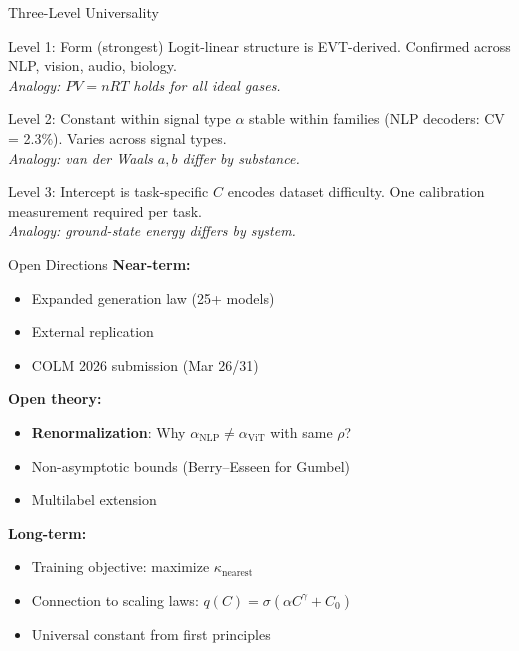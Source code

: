 \documentclass[aspectratio=169,14pt]{beamer}
\begin{document}
\begin{frame}{Three-Level Universality}
\begin{block}{Level 1: Form (strongest)}
Logit-linear structure is EVT-derived. Confirmed across NLP, vision, audio, biology.\\
\textit{Analogy: $PV = nRT$ holds for all ideal gases.}
\end{block}

\begin{block}{Level 2: Constant within signal type}
$\alpha$ stable within families (NLP decoders: CV = 2.3\%). Varies across signal types.\\
\textit{Analogy: van der Waals $a, b$ differ by substance.}
\end{block}

\begin{alertblock}{Level 3: Intercept is task-specific}
$C$ encodes dataset difficulty. One calibration measurement required per task.\\
\textit{Analogy: ground-state energy differs by system.}
\end{alertblock}
\end{frame}

\begin{frame}{Open Directions}
\textbf{Near-term:}
\begin{itemize}
\item Expanded generation law (25+ models)
\item External replication
\item COLM 2026 submission (Mar 26/31)
\end{itemize}

\textbf{Open theory:}
\begin{itemize}
\item \textbf{Renormalization}: Why $\alpha_\mathrm{NLP} \neq \alpha_\mathrm{ViT}$ with same $\rho$?
\item Non-asymptotic bounds (Berry--Esseen for Gumbel)
\item Multilabel extension
\end{itemize}

\textbf{Long-term:}
\begin{itemize}
\item Training objective: maximize $\kappa_\mathrm{nearest}$
\item Connection to scaling laws: $q(C) = \sigma(\alpha C^\gamma + C_0)$
\item Universal constant from first principles
\end{itemize}
\end{frame}
\end{document}
